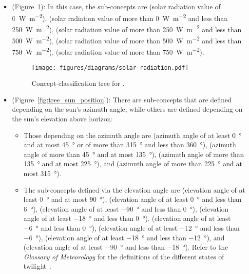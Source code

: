 \begin{itemize}
  \item {} (Figure~\ref{fig:tree_solar_radiation}): In this case, the sub-concepts are  (solar radiation value of \SI{0}{\watt\per\square\meter}),  (solar radiation value of more than \SI{0}{\watt\per\square\meter} and less than \SI{250}{\watt\per\square\meter}),  (solar radiation value of more than \SI{250}{\watt\per\square\meter} and less than \SI{500}{\watt\per\square\meter}),  (solar radiation value of more than \SI{500}{\watt\per\square\meter} and less than \SI{750}{\watt\per\square\meter}),  (solar radiation value of more than \SI{750}{\watt\per\square\meter}).
  
  \begin{figure}
    \centering
    \texttt{[image: figures/diagrams/solar-radiation.pdf]}
    \caption[Concept-classification tree for ]{Concept-classification tree for .}
    \label{fig:tree_solar_radiation}
  \end{figure}

  \item {} (Figure~\ref{fig:tree_sun_position}): There are sub-concepts that are defined depending on the sun's azimuth angle, while others are defined depending on the sun's elevation above horizon:
    \begin{itemize}
      \item Those depending on the azimuth angle are  (azimuth angle of at least \SI{0}{\degree} and at most \SI{45}{\degree} or of more than \SI{315}{\degree} and less than \SI{360}{\degree}),  (azimuth angle of more than \SI{45}{\degree} and at most \SI{135}{\degree}),  (azimuth angle of more than \SI{135}{\degree} and at most \SI{225}{\degree}), and  (azimuth angle of more than \SI{225}{\degree} and at most \SI{315}{\degree}).
      
      \item The sub-concepts defined via the elevation angle are  (elevation angle of at least \SI{0}{\degree} and at most \SI{90}{\degree}),  (elevation angle of at least \SI{0}{\degree} and less than \SI{6}{\degree}),  (elevation angle of at least \SI{-90}{\degree} and less than \SI{0}{\degree}),  (elevation angle of at least \SI{-18}{\degree} and less than \SI{0}{\degree}),  (elevation angle of at least \SI{-6}{\degree} and less than \SI{0}{\degree}),  (elevation angle of at least \SI{-12}{\degree} and less than \SI{-6}{\degree}),  (elevation angle of at least \SI{-18}{\degree} and less than \SI{-12}{\degree}), and  (elevation angle of at least \SI{-90}{\degree} and less than \SI{-18}{\degree}). Refer to the \emph{Glossary of Meteorology} for the definitions of the different states of twilight~\cite{GlossaryOfMeteorology}.
    \end{itemize}
  

\end{itemize}
